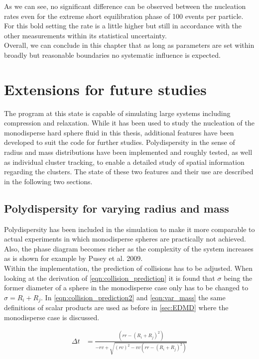 As we can see, no significant difference can be observed between the nucleation rates even for the extreme short equilibration phase of 100 events per particle. For this bold setting the rate is a little higher but still in accordance with the other measurements within its statistical uncertainty.\\

Overall, we can conclude in this chapter that as long as parameters are set within broadly but reasonable boundaries no systematic influence is expected. 

\section{Extensions for future studies}
\label{sec:simulation_ext}
The program at this state is capable of simulating large systems including compression and relaxation. While it has been used to study the nucleation of the monodisperse hard sphere fluid in this thesis, additional features have been developed to suit the code for further studies. Polydispersity in the sense of radius and mass distributions have been implemented and roughly tested, as well as individual cluster tracking, to enable a detailed study of spatial information regarding the clusters. The state of these two features and their use are described in the following two sections.

\subsection{Polydispersity for varying radius and mass}
\label{sec:extension_radius}
Polydispersity has been included in the simulation to make it more comparable to actual experiments in which monodisperse spheres are practically not achieved. Also, the phase diagram becomes richer as the complexity of the system increases as is shown for example by Pusey et al. 2009\cite{Pusey2009}.\\ 
Within the implementation, the prediction of collisions has to be adjusted. When looking at the derivation of \autoref{eqn:collision_prediction} it is found that $\sigma$ being the former diameter of a sphere in the monodisperse case only has to be changed to $\sigma=R_i+R_j$. In \autoref{eqn:collision_prediction2} and \autoref{eqn:var_mass} the same definitions of scalar products are used as before in \autoref{sec:EDMD} where the monodisperse case is discussed.

\begin{align}
\label{eqn:collision_prediction2}
\Delta t &= \frac{\left(rr - (R_i+R_j)^2 \right)}{ - rv + \sqrt{ (rv)^2  - vv \left(rr - (R_i+R_j)^2 \right)}}
\end{align} 

